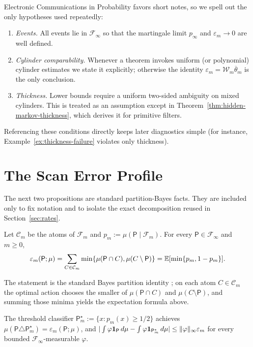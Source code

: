 Electronic Communications in Probability favors short notes, so we spell out
the only hypotheses used repeatedly:
\begin{enumerate}[label=(\alph*)]
\item \emph{Events.}  All events lie in $\mathcal{F}_\infty$ so that the
  martingale limit $p_\infty$ and $\varepsilon_m\to 0$ are well defined.
\item \emph{Cylinder comparability.}  Whenever a theorem invokes uniform (or
  polynomial) cylinder estimates we state it explicitly; otherwise the identity
  $\varepsilon_m=\mathcal{W}_m\overline{\theta}_m$ is the only conclusion.
\item \emph{Thickness.}  Lower bounds require a uniform two-sided ambiguity on
  mixed cylinders.  This is treated as an assumption except in
  Theorem~\ref{thm:hidden-markov-thickness}, which derives it for primitive
  filters.
\end{enumerate}
Referencing these conditions directly keeps later diagnostics simple (for
instance, Example~\ref{ex:thickness-failure} violates only thickness).

\section{The Scan Error Profile}
\label{sec:scan}

The next two propositions are standard partition-Bayes facts.  They are
included only to fix notation and to isolate the exact decomposition reused in
Section~\ref{sec:rates}.

\begin{proposition}
\label{prop:scan-error-cylinder}
Let $\mathcal{C}_m$ be the atoms of $\mathcal{F}_m$ and $p_m:=\mu(\mathsf{P}\mid\mathcal{F}_m)$.
For every $\mathsf{P}\in\mathcal{F}_\infty$ and $m\ge 0$,
\[
\varepsilon_m(\mathsf{P};\mu)
=\sum_{C\in\mathcal{C}_m}\min\{\mu(\mathsf{P}\cap C),\mu(C\setminus\mathsf{P})\}
=\mathbb{E}[\min\{p_m,1-p_m\}].
\]
\end{proposition}

The statement is the standard Bayes partition identity
\cite[Chapter~6]{DevroyeGyorfiLugosi1996}; on each atom $C\in\mathcal{C}_m$ the
optimal action chooses the smaller of $\mu(\mathsf{P}\cap C)$ and
$\mu(C\setminus\mathsf{P})$, and summing those minima yields the
expectation formula above.

\begin{proposition}
\label{prop:bayes-optimality}
The threshold classifier $\mathsf{P}_m^\star:=\{x:p_m(x)\ge 1/2\}$ achieves
$\mu(\mathsf{P}\triangle\mathsf{P}_m^\star)=\varepsilon_m(\mathsf{P};\mu)$, and
$|\int\varphi\mathbf{1}_{\mathsf{P}}\,d\mu-\int\varphi\mathbf{1}_{\mathsf{P}_m^\star}\,d\mu|\le\|\varphi\|_\infty\varepsilon_m$
for every bounded $\mathcal{F}_\infty$-measurable $\varphi$.
\end{proposition}

